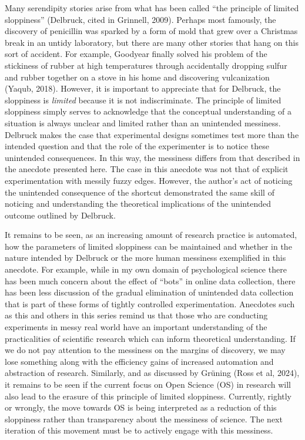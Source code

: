\documentclass[authordate, commentary]{jote-new-article}
\begin{document}
	Many serendipity stories arise from what has been called “the principle of limited sloppiness” (Delbruck, cited in Grinnell, 2009). Perhaps most famously, the discovery of penicillin was sparked by a form of mold that grew over a Christmas break in an untidy laboratory, but there are many other stories that hang on this sort of accident. For example, Goodyear finally solved his problem of the stickiness of rubber at high temperatures through accidentally dropping sulfur and rubber together on a stove in his home and discovering vulcanization (Yaqub, 2018). However, it is important to appreciate that for Delbruck, the sloppiness is \emph{limited} because it is not indiscriminate. The principle of limited sloppiness simply serves to acknowledge that the conceptual understanding of a situation is always unclear and limited rather than an unintended messiness. Delbruck makes the case that experimental designs sometimes test more than the intended question and that the role of the experimenter is to notice these unintended consequences. In this way, the messiness differs from that described in the anecdote presented here. The case in this anecdote was not that of explicit experimentation with messily fuzzy edges. However, the author's act of noticing the unintended consequence of the shortcut demonstrated the same skill of noticing and understanding the theoretical implications of the unintended outcome outlined by Delbruck.



	It remains to be seen, as an increasing amount of research practice is automated, how the parameters of limited sloppiness can be maintained and whether in the nature intended by Delbruck or the more human messiness exemplified in this anecdote. For example, while in my own domain of psychological science there has been much concern about the effect of “bots” in online data collection, there has been less discussion of the gradual elimination of unintended data collection that is part of these forms of tightly controlled experimentation. Anecdotes such as this and others in this series remind us that those who are conducting experiments in messy real world have an important understanding of the practicalities of scientific research which can inform theoretical understanding. If we do not pay attention to the messiness on the margins of discovery, we may lose something along with the efficiency gains of increased automation and abstraction of research. Similarly, and as discussed by Grüning (Ross et al, 2024), it remains to be seen if the current focus on Open Science (OS) in research will also lead to the erasure of this principle of limited sloppiness. Currently, rightly or wrongly, the move towards OS is being interpreted as a reduction of this sloppiness rather than transparency about the messiness of science. The next iteration of this movement must be to actively engage with this messiness.
\end{document}
